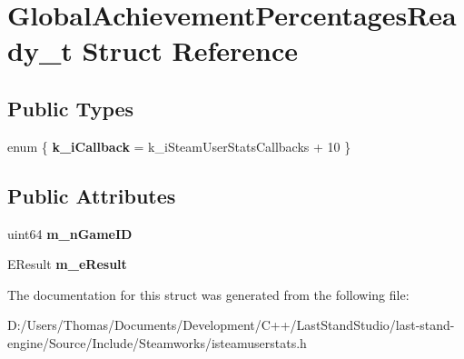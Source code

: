 \hypertarget{structGlobalAchievementPercentagesReady__t}{}\section{Global\+Achievement\+Percentages\+Ready\+\_\+t Struct Reference}
\label{structGlobalAchievementPercentagesReady__t}
\subsection*{Public Types}
\begin{DoxyCompactItemize}
\item 
\hypertarget{structGlobalAchievementPercentagesReady__t_ac71eb7972d7b29a4f4bb85f668dff2ba}{}enum \{ {\bfseries k\+\_\+i\+Callback} = k\+\_\+i\+Steam\+User\+Stats\+Callbacks + 10
 \}\label{structGlobalAchievementPercentagesReady__t_ac71eb7972d7b29a4f4bb85f668dff2ba}

\end{DoxyCompactItemize}
\subsection*{Public Attributes}
\begin{DoxyCompactItemize}
\item 
\hypertarget{structGlobalAchievementPercentagesReady__t_a22d8e858e29056ad5ca8ee0882f05a24}{}uint64 {\bfseries m\+\_\+n\+Game\+I\+D}\label{structGlobalAchievementPercentagesReady__t_a22d8e858e29056ad5ca8ee0882f05a24}

\item 
\hypertarget{structGlobalAchievementPercentagesReady__t_ad99008f7a0850b4dedd0867d497b8969}{}E\+Result {\bfseries m\+\_\+e\+Result}\label{structGlobalAchievementPercentagesReady__t_ad99008f7a0850b4dedd0867d497b8969}

\end{DoxyCompactItemize}


The documentation for this struct was generated from the following file\+:\begin{DoxyCompactItemize}
\item 
D\+:/\+Users/\+Thomas/\+Documents/\+Development/\+C++/\+Last\+Stand\+Studio/last-\/stand-\/engine/\+Source/\+Include/\+Steamworks/isteamuserstats.\+h\end{DoxyCompactItemize}
